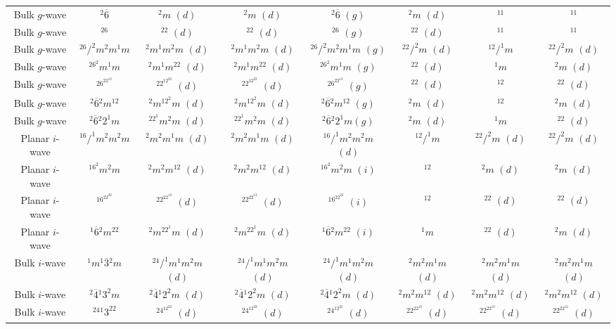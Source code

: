 \documentclass[11pt]{article}
\begin{document}
\begin{table}[htbp]
{\begin{tabular}{c|c|c c c c c c }
		Bulk $g$-wave	  &  $^2\overline{6}$ & $^2m$ $(d)$ & $^2m$ $(d)$ & $^2\overline{6}$ $(g)$ & $^2m$ $(d)$ & $^11$ & $^11$ \\
		Bulk $g$-wave	  &  $^26$ & $^22$ $(d)$ & $^22$ $(d)$ & $^26$ $(g)$ & $^22$ $(d)$ & $^11$& $^11$ \\
		Bulk $g$-wave		  &  $^26/^2m^2m^1m$ & $^2m^1m^2m$ $(d)$ & $^2m^1m^2m$ $(d)$ & $^26/^2m^2m^1m$ $(g)$ & $^22/^2m$ $(d)$ & $^12/^1m$ & $^22/^2m$ $(d)$\\
		Bulk $g$-wave		 &   $^26^2m^1m$ & $^2m^1m^22$ $(d)$ & $^2m^1m^22$ $(d)$ & $^26^2m^1m$ $(g)$ & $^22$ $(d)$ & $^1m$ & $^2m$ $(d)$ \\
		Bulk $g$-wave		 &   $^26^22^12$& $^22^12^22$ $(d)$ & $^22^12^22 $ $(d)$ & $^26^22^12$ $(g)$ & $^22$ $(d)$ & $^12$ & $^22$ $(d)$ \\
		Bulk $g$-wave		 &   $^2\overline{6}{^2}m^12$ & $^2m^12^2m$ $(d)$ & $^2m^12^2m$ $(d)$ & $^2\overline{6}{^2}m^12$ $(g)$ & $^2m$ $(d)$ & $^12$ & $^2m$ $(d)$ \\
		Bulk $g$-wave		  &  $^2\overline{6}{^2}2^1m$& $^22^1m^2m$ $(d)$ & $^22^1m^2m$ $(d)$ & $^2\overline{6}{^2}2^1m (g)$ & $^2m$  $(d)$ & $^1m$ & $^22$ $(d)$ \\
		Planar $i$-wave		  &  $^16/^1m^2m^2m$ & $^2m^2m^1m$ $(d)$ & $^2m^2m^1m$ $(d)$ & $^16/^1m^2m^2m$ $(d)$ & $^12/^1m$ & $^22/^2m$ $(d)$ & $^22/^2m$ $(d)$ \\
		Planar $i$-wave		 &   $^16^2m^2m$ & $^2m^2m^12$ $(d)$ & $^2m^2m^12$ $(d)$ & $^16^2m^2m$ $(i)$ & $^12$ & $^2m$ $(d)$ & $^2m$ $(d)$\\
		Planar $i$-wave		 &   $^16^22^22$& $^22^22^12$ $(d)$ & $^22^22^12$ $(d)$ & $^16^22^22$ $(i)$ & $^12$ & $^22$ $(d)$ & $^22$ $(d)$\\
		Planar $i$-wave		 &   $^1\overline{6}{^2}m^22$& $^2m^22^1m$ $(d)$ & $^2m^22^1m$ $(d)$ & $^1\overline{6}{^2}m^22$ $(i)$ & $^1m$ & $^22$ $(d)$ & $^2m$ $(d)$ \\
		Bulk $i$-wave & $^1m^1\overline{3}{^2}m$ & $^24/^1m^1m^2m$ $(d)$ & $^24/^1m^1m^2m$ $(d)$ & $^24/^1m^1m^2m$ $(d)$ & $^2m^2m^1m$ $(d)$ & $^2m^2m^1m$ $(d)$ & $^2m^2m^1m$ $(d)$ \\
		Bulk $i$-wave & $^2\overline{4}{^1}3^2m$ & $^2\overline{4}{^1}2^2m$ $(d)$ & $^2\overline{4}{^1}2^2m$ $(d)$ & $^2\overline{4}{^1}2^2m$ $(d)$ & $^2m^2m^12$ $(d)$ & $^2m^2m^12$ $(d)$ & $^2m^2m^12$ $(d)$ \\
		Bulk $i$-wave & $^24{^1}3^22$ & $^24^12^22$ $(d)$ & $^24^12^22$ $(d)$ & $^24^12^22$ $(d)$ & $^22^22^12$ $(d)$ & $^22^22^12$ $(d)$ & $^22^22^12$ $(d)$ \\
		
		\hline \hline
	\end{tabular}
}
\end{table}
\end{document}

